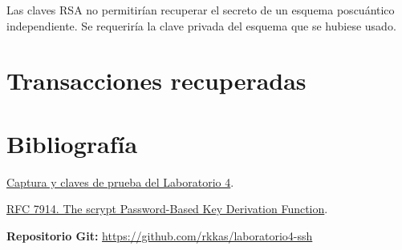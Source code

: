 \documentclass[letterpaper,11pt]{article}
\begin{document}
Las claves RSA no permitirían recuperar el secreto de un esquema poscuántico independiente. Se requeriría la clave privada del esquema que se hubiese usado.

\clearpage
\section*{Transacciones recuperadas}

\section*{Bibliografía}
\href{https://drive.google.com/drive/folders/1rXMp5y9WeBR36iytc4RBaqXKWf3ea-WU}{Captura y claves de prueba del Laboratorio 4}.\par
\href{https://www.rfc-editor.org/rfc/rfc7914.html}{RFC 7914. The scrypt Password-Based Key Derivation Function}.\par
\medskip
\textbf{Repositorio Git:} \url{https://github.com/rkkas/laboratorio4-ssh}\par
\end{document}
